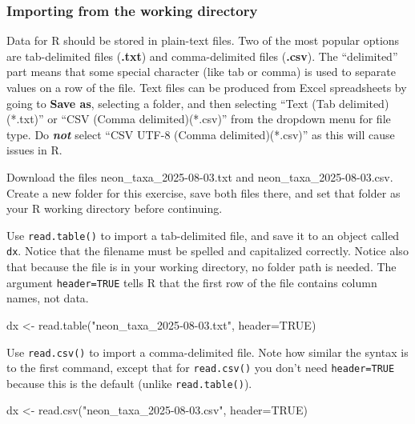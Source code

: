 \documentclass[
  13,
  letterpaper,
]{report}
\newenvironment{Shaded}{\begin{snugshade}}{\end{snugshade}}
\newcommand{\AttributeTok}[1]{\textcolor[rgb]{0.40,0.45,0.13}{#1}}
\newcommand{\ConstantTok}[1]{\textcolor[rgb]{0.56,0.35,0.01}{#1}}
\newcommand{\FunctionTok}[1]{\textcolor[rgb]{0.28,0.35,0.67}{#1}}
\newcommand{\NormalTok}[1]{\textcolor[rgb]{0.00,0.23,0.31}{#1}}
\newcommand{\OtherTok}[1]{\textcolor[rgb]{0.00,0.23,0.31}{#1}}
\newcommand{\StringTok}[1]{\textcolor[rgb]{0.13,0.47,0.30}{#1}}
\begin{document}
\subsubsection{Importing from the working
directory}\label{importing-from-the-working-directory}

Data for R should be stored in plain-text files. Two of the most popular
options are tab-delimited files (\textbf{.txt}) and comma-delimited
files (\textbf{.csv}). The ``delimited'' part means that some special
character (like tab or comma) is used to separate values on a row of the
file. Text files can be produced from Excel spreadsheets by going to
\textbf{Save as}, selecting a folder, and then selecting ``Text (Tab
delimited)(*.txt)'' or ``CSV (Comma delimited)(*.csv)'' from the
dropdown menu for file type. Do \textbf{\emph{not}} select ``CSV UTF-8
(Comma delimited)(*.csv)'' as this will cause issues in R.

Download the files neon\_taxa\_2025-08-03.txt and
neon\_taxa\_2025-08-03.csv. Create a new folder for this exercise, save
both files there, and set that folder as your R working directory before
continuing.

Use \texttt{read.table()} to import a tab-delimited file, and save it to
an object called \texttt{dx}. Notice that the filename must be spelled
and capitalized correctly. Notice also that because the file is in your
working directory, no folder path is needed. The argument
\texttt{header=TRUE} tells R that the first row of the file contains
column names, not data.

\begin{Shaded}
\begin{Highlighting}[]
\NormalTok{dx }\OtherTok{\textless{}{-}} \FunctionTok{read.table}\NormalTok{(}\StringTok{"neon\_taxa\_2025{-}08{-}03.txt"}\NormalTok{, }\AttributeTok{header=}\ConstantTok{TRUE}\NormalTok{)}
\end{Highlighting}
\end{Shaded}

Use \texttt{read.csv()} to import a comma-delimited file. Note how
similar the syntax is to the first command, except that for
\texttt{read.csv()} you don't need \texttt{header=TRUE} because this is
the default (unlike \texttt{read.table()}).

\begin{Shaded}
\begin{Highlighting}[]
\NormalTok{dx }\OtherTok{\textless{}{-}} \FunctionTok{read.csv}\NormalTok{(}\StringTok{"neon\_taxa\_2025{-}08{-}03.csv"}\NormalTok{, }\AttributeTok{header=}\ConstantTok{TRUE}\NormalTok{)}
\end{Highlighting}
\end{Shaded}
\end{document}
